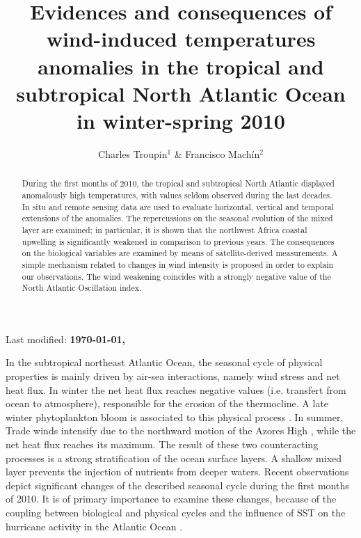 \documentclass[12pt]{article}
\title{Evidences and consequences of wind-induced temperatures anomalies in the tropical and subtropical North Atlantic Ocean in winter-spring 2010}
\author{Charles Troupin$^{1}$ \& Francisco Machín$^2$}
\date{}
\begin{document}
\linenumbers
\maketitle
\begin{center}
Last modified: \textbf{\today , \currenttime}
\end{center}


\begin{abstract}

During the first months of 2010, the tropical and subtropical North Atlantic displayed anomalously high temperatures, with values seldom observed during the last decades. In situ and remote sensing data are used to evaluate horizontal, vertical and temporal extensions of the anomalies. The repercussions on the seasonal evolution of the mixed layer are examined; in particular, it is shown that the northwest Africa coastal upwelling is significantly weakened in comparison to previous years. The consequences on the biological variables are examined by means of satellite-derived measurements. A simple mechanism related to changes in wind intensity is proposed in order to explain our observations. The wind weakening coincides with a strongly negative value of the North Atlantic Oscillation index. 

\end{abstract}

In the subtropical northeast Atlantic Ocean, the seasonal cycle of physical properties is mainly driven by air-sea interactions, namely wind stress and net heat flux. In winter the net heat flux reaches negative values (i.e. transfert from ocean to atmosphere), responsible for the erosion of the thermocline. A late winter phytoplankton bloom is associated to this physical process \citep[e.g.][]{DELEON73,HERNANDEZLEON84,HERNANDEZLEON04}. In summer, Trade winds intensify due to the northward motion of the Azores High \citep{WOOSTER76}, while the net heat flux reaches its maximum. The result of these two counteracting processes is a strong stratification of the ocean surface layers. A shallow mixed layer prevents the injection of nutrients from deeper waters. Recent observations depict significant changes of the described seasonal cycle during the first months of 2010. It is of primary importance to examine these changes, because of the coupling between biological and physical cycles \citep{ARISTEGUI01,TROUPIN10} and the influence of SST on the hurricane activity in the Atlantic Ocean \citep[e.g.][]{GOLDENBERG2001}. 
\end{document}
